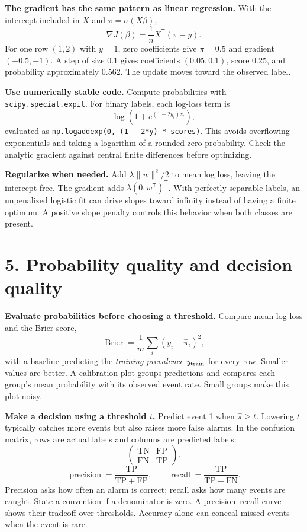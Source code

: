 \documentclass[11pt,a4paper]{article}
\newcommand{\T}{^{\mathsf T}}
\newcommand{\code}[1]{\texttt{\small #1}}
\begin{document}
\textbf{The gradient has the same pattern as linear regression.}
With the intercept included in $X$ and $\pi=\sigma(X\beta)$,
\[
\boxed{\nabla J(\beta)=\frac1nX\T(\pi-y).}
\]
For one row $(1,2)$ with $y=1$, zero coefficients give $\pi=0.5$ and gradient
$(-0.5,-1)$. A step of size 0.1 gives coefficients $(0.05,0.1)$, score 0.25,
and probability approximately 0.562. The update moves toward the observed label.

\textbf{Use numerically stable code.}
Compute probabilities with \code{scipy.special.expit}. For binary labels,
each log-loss term is
\[
\log\!\left(1+e^{(1-2y_i)z_i}\right),
\]
evaluated as \code{np.logaddexp(0, (1 - 2*y) * scores)}. This avoids
overflowing exponentials and taking a logarithm of a rounded zero probability.
Check the analytic gradient against central finite differences before optimizing.

\textbf{Regularize when needed.} Add $\lambda\|w\|^2/2$ to mean log loss,
leaving the intercept free. The gradient adds $\lambda(0,w\T)\T$.
With perfectly separable labels, an unpenalized logistic fit can drive slopes
toward infinity instead of having a finite optimum. A positive slope penalty
controls this behavior when both classes are present.

\newpage
\section*{5. Probability quality and decision quality}
\textbf{Evaluate probabilities before choosing a threshold.}
Compare mean log loss and the Brier score,
\[
\operatorname{Brier}=\frac1m\sum_i(y_i-\widehat\pi_i)^2,
\]
with a baseline predicting the \emph{training prevalence}
$\bar y_{\rm train}$ for every row. Smaller values are better.
A calibration plot groups predictions and compares each group's mean probability
with its observed event rate. Small groups make this plot noisy.

\textbf{Make a decision using a threshold $t$.}
Predict event 1 when $\widehat\pi\ge t$. Lowering $t$ typically catches more
events but also raises more false alarms. In the confusion matrix, rows are
actual labels and columns are predicted labels:
\[
\begin{pmatrix}\mathrm{TN}&\mathrm{FP}\\\mathrm{FN}&\mathrm{TP}\end{pmatrix}.
\]
\[
\operatorname{precision}=\frac{\mathrm{TP}}{\mathrm{TP}+\mathrm{FP}},\qquad
\operatorname{recall}=\frac{\mathrm{TP}}{\mathrm{TP}+\mathrm{FN}}.
\]
Precision asks how often an alarm is correct; recall asks how many events are
caught. State a convention if a denominator is zero. A precision--recall curve
shows their tradeoff over thresholds. Accuracy alone can conceal missed events
when the event is rare.
\end{document}
